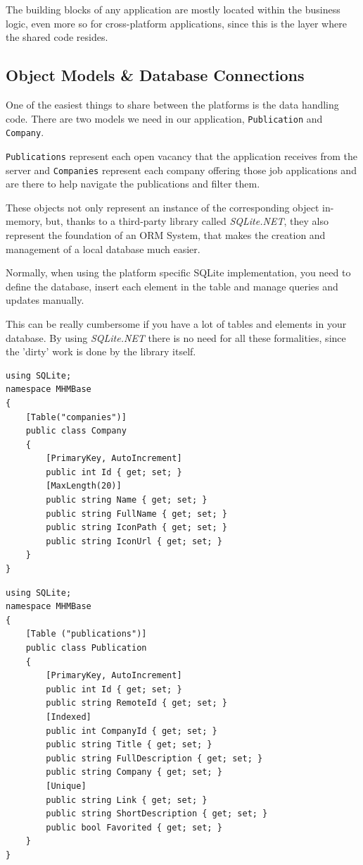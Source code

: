 The building blocks of any application are mostly located within the business logic, even more so for cross-platform applications, since this is the layer where the shared code resides.

\subsection{Object Models \& Database Connections}
One of the easiest things to share between the platforms is the data handling code. There are two models we need in our application, \texttt{Publication} and \texttt{Company}.  

\texttt{Publications} represent each open vacancy that the application receives from the server and \texttt{Companies} represent each company offering those job applications and are there to help navigate the publications and filter them.

These objects not only represent an instance of the corresponding object in-memory, but, thanks to a third-party library called \textit{SQLite.NET}, they also represent the foundation of an \ac{ORM} System, that makes the creation and management of a local database much easier.

Normally, when using the platform specific SQLite implementation, you need to define the database, insert each element in the table and manage queries and updates manually. 

This can be really cumbersome if you have a lot of tables and elements in your database. By using \textit{SQLite.NET} there is no need for all these formalities, since the 'dirty' work is done by the library itself.
\vfill

\lstset{language=[Sharp]C}
\begin{lstlisting}[frame=lt,caption=Company.cs, label={list:comp}]
using SQLite;
namespace MHMBase
{
	[Table("companies")]
	public class Company
	{
		[PrimaryKey, AutoIncrement]
		public int Id { get; set; }
		[MaxLength(20)]
		public string Name { get; set; }
		public string FullName { get; set; }
		public string IconPath { get; set; }
		public string IconUrl { get; set; }
	}
}
\end{lstlisting}

\begin{lstlisting}[frame=lt,caption=Publication.cs, label={list:pub}]
using SQLite;
namespace MHMBase
{
	[Table ("publications")]
	public class Publication
	{
		[PrimaryKey, AutoIncrement]
		public int Id { get; set; }
		public string RemoteId { get; set; }
		[Indexed]
		public int CompanyId { get; set; }
		public string Title { get; set; }
		public string FullDescription { get; set; }
		public string Company { get; set; }
		[Unique]
		public string Link { get; set; }
		public string ShortDescription { get; set; }
		public bool Favorited { get; set; }
	}
}
\end{lstlisting}


